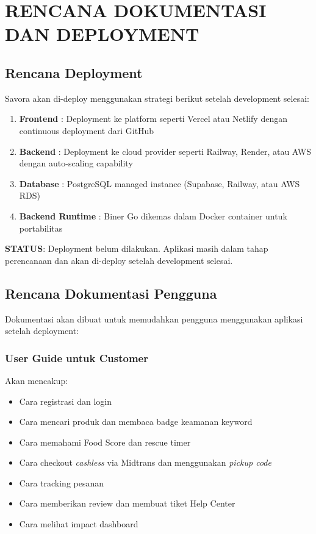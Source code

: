 \section{RENCANA DOKUMENTASI DAN DEPLOYMENT}

\subsection{Rencana Deployment}

Savora akan di-deploy menggunakan strategi berikut setelah development selesai:

\begin{enumerate}[leftmargin=*]
    \item \textbf{Frontend} : Deployment ke platform seperti Vercel atau Netlify dengan continuous deployment dari GitHub
    \item \textbf{Backend} : Deployment ke cloud provider seperti Railway, Render, atau AWS dengan auto-scaling capability
    \item \textbf{Database} : PostgreSQL managed instance (Supabase, Railway, atau AWS RDS)
    \item \textbf{Backend Runtime} : Biner Go dikemas dalam Docker container untuk portabilitas
\end{enumerate}

\textbf{STATUS}: Deployment belum dilakukan. Aplikasi masih dalam tahap perencanaan dan akan di-deploy setelah development selesai.

\subsection{Rencana Dokumentasi Pengguna}

Dokumentasi akan dibuat untuk memudahkan pengguna menggunakan aplikasi setelah deployment:

\subsubsection{User Guide untuk Customer}
Akan mencakup:
\begin{itemize}[leftmargin=*]
    \item Cara registrasi dan login
    \item Cara mencari produk dan membaca badge keamanan keyword
    \item Cara memahami Food Score dan rescue timer
    \item Cara checkout \textit{cashless} via Midtrans dan menggunakan \textit{pickup code}
    \item Cara tracking pesanan
    \item Cara memberikan review dan membuat tiket Help Center
    \item Cara melihat impact dashboard
\end{itemize}

